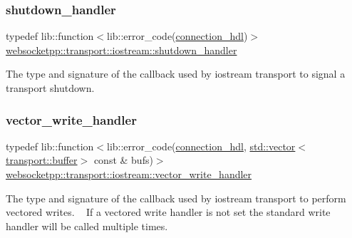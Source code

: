 \subsubsection{\texorpdfstring{shutdown\+\_\+handler}{shutdown\_handler}}
{\footnotesize\ttfamily typedef lib\+::function$<$lib\+::error\+\_\+code(\mbox{\hyperlink{namespacewebsocketpp_a6b3d26a10ee7229b84b776786332631d}{connection\+\_\+hdl}})$>$ \mbox{\hyperlink{namespacewebsocketpp_1_1transport_1_1iostream_a3563ce2cca06b1466f7d76ecb8eb4a0b}{websocketpp\+::transport\+::iostream\+::shutdown\+\_\+handler}}}

The type and signature of the callback used by iostream transport to signal a transport shutdown. \mbox{\label{namespacewebsocketpp_1_1transport_1_1iostream_a21982146513c0b5580786c3af5dd2878}} 
\subsubsection{\texorpdfstring{vector\+\_\+write\+\_\+handler}{vector\_write\_handler}}
{\footnotesize\ttfamily typedef lib\+::function$<$lib\+::error\+\_\+code(\mbox{\hyperlink{namespacewebsocketpp_a6b3d26a10ee7229b84b776786332631d}{connection\+\_\+hdl}}, \mbox{\hyperlink{classstd_1_1vector}{std\+::vector}}$<$\mbox{\hyperlink{structwebsocketpp_1_1transport_1_1buffer}{transport\+::buffer}}$>$ const \& bufs)$>$ \mbox{\hyperlink{namespacewebsocketpp_1_1transport_1_1iostream_a21982146513c0b5580786c3af5dd2878}{websocketpp\+::transport\+::iostream\+::vector\+\_\+write\+\_\+handler}}}

The type and signature of the callback used by iostream transport to perform vectored writes. ~\newline
If a vectored write handler is not set the standard write handler will be called multiple times. 